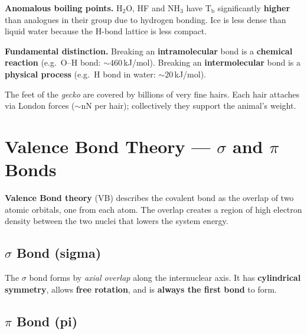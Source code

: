 \documentclass[a4paper,11pt]{article}
\begin{document}
\begin{attenzione}
\textbf{Anomalous boiling points.} H$_2$O, HF and NH$_3$ have T$_\text{b}$ significantly \textbf{higher} than analogues in their group due to hydrogen bonding. Ice is less dense than liquid water because the H-bond lattice is less compact.
\end{attenzione}

\begin{attenzione}
\textbf{Fundamental distinction.} Breaking an \textbf{intramolecular} bond is a \textbf{chemical reaction} (e.g.\ O--H bond: $\sim 460$\,kJ/mol). Breaking an \textbf{intermolecular} bond is a \textbf{physical process} (e.g.\ H bond in water: $\sim 20$\,kJ/mol).
\end{attenzione}

\begin{esempio}
The feet of the \textit{gecko} are covered by billions of very fine hairs. Each hair attaches via London forces ($\sim$nN per hair); collectively they support the animal's weight.
\end{esempio}

\clearpage

\section{Valence Bond Theory --- $\sigma$ and $\pi$ Bonds}

\begin{definizione}
\textbf{Valence Bond theory} (VB) describes the covalent bond as the overlap of two atomic orbitals, one from each atom. The overlap creates a region of high electron density between the two nuclei that lowers the system energy.
\end{definizione}

\subsection{$\sigma$ Bond (sigma)}

\begin{definizione}
The $\sigma$ bond forms by \textit{axial overlap} along the internuclear axis. It has \textbf{cylindrical symmetry}, allows \textbf{free rotation}, and is \textbf{always the first bond} to form.
\end{definizione}

\subsection{$\pi$ Bond (pi)}
\end{document}
